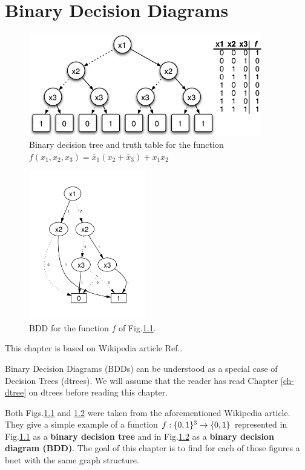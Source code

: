 \chapter{Binary Decision Diagrams}
\begin{figure}[h!]
\centering
\includegraphics[width=4in]{binarydd/bdd-tree.png}
\caption{Binary decision tree and truth table 
for the function $
f(x_1, x_2,x_3)=
\bar{x}_1(x_2+\bar{x}_3)  + x_1 x_2 $ }
\label{fig-bdd-tree}
\end{figure}

\begin{figure}[h!]
\centering
\includegraphics[width=2in]{binarydd/bdd.png}
\caption{BDD for the function $f$
of Fig.\ref{fig-bdd-tree}.} 
\label{fig-bdd}
\end{figure}

This chapter is based
on Wikipedia article Ref.\cite{wiki-bdd}.

Binary Decision Diagrams (BDDs)
can be understood as a special
case of Decision Trees (dtrees).
We will
assume
that the reader has read
Chapter \ref{ch-dtree} 
on dtrees before
reading this chapter.

Both Figs.\ref{fig-bdd-tree}
and \ref{fig-bdd} were taken
from the aforementioned Wikipedia article. They
give a simple example of a function
$f:\{0,1\}^3\rightarrow\{0,1\}$
represented in
Fig.\ref{fig-bdd-tree} as a
{\bf binary decision tree}
 and in Fig.\ref{fig-bdd} as a {\bf binary
decision diagram (BDD)}.
The goal 
of this chapter is
to find for each  of those 
figures a bnet with
the same graph structure.

